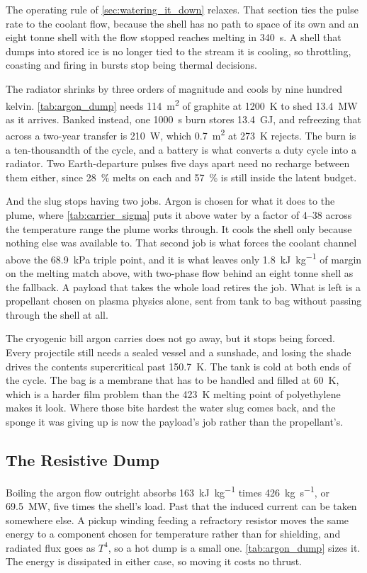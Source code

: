 \documentclass{article}
\begin{document}
The operating rule of \autoref{sec:watering_it_down} relaxes. That section ties the pulse rate to the coolant flow, because the shell has no path to space of its own and an eight tonne shell with the flow stopped reaches melting in \SI{340}{\second}. A shell that dumps into stored ice is no longer tied to the stream it is cooling, so throttling, coasting and firing in bursts stop being thermal decisions.

The radiator shrinks by three orders of magnitude and cools by nine hundred kelvin. \autoref{tab:argon_dump} needs \SI{114}{\square\meter} of graphite at \SI{1200}{\kelvin} to shed \SI{13.4}{\mega\watt} as it arrives. Banked instead, one \SI{1000}{\second} burn stores \SI{13.4}{\giga\joule}, and refreezing that across a two-year transfer is \SI{210}{\watt}, which \SI{0.7}{\square\meter} at \SI{273}{\kelvin} rejects. The burn is a ten-thousandth of the cycle, and a battery is what converts a duty cycle into a radiator. Two Earth-departure pulses five days apart need no recharge between them either, since \SI{28}{\percent} melts on each and \SI{57}{\percent} is still inside the latent budget.

And the slug stops having two jobs. Argon is chosen for what it does to the plume, where \autoref{tab:carrier_sigma} puts it above water by a factor of \numrange{4}{38} across the temperature range the plume works through. It cools the shell only because nothing else was available to. That second job is what forces the coolant channel above the \SI{68.9}{\kilo\pascal} triple point, and it is what leaves only \SI{1.8}{\kilo\joule\per\kilogram} of margin on the melting match above, with two-phase flow behind an eight tonne shell as the fallback. A payload that takes the whole load retires the job. What is left is a propellant chosen on plasma physics alone, sent from tank to bag without passing through the shell at all.

The cryogenic bill argon carries does not go away, but it stops being forced. Every projectile still needs a sealed vessel and a sunshade, and losing the shade drives the contents supercritical past \SI{150.7}{\kelvin}. The tank is cold at both ends of the cycle. The bag is a membrane that has to be handled and filled at \SI{60}{\kelvin}, which is a harder film problem than the \SI{423}{\kelvin} melting point of polyethylene makes it look. Where those bite hardest the water slug comes back, and the sponge it was giving up is now the payload's job rather than the propellant's.

\subsection*{The Resistive Dump}
Boiling the argon flow outright absorbs \SI{163}{\kilo\joule\per\kilogram} times \SI{426}{\kilogram\per\second}, or \SI{69.5}{\mega\watt}, five times the shell's load. Past that the induced current can be taken somewhere else. A pickup winding feeding a refractory resistor moves the same energy to a component chosen for temperature rather than for shielding, and radiated flux goes as $T^4$, so a hot dump is a small one. \autoref{tab:argon_dump} sizes it. The energy is dissipated in either case, so moving it costs no thrust.
\end{document}
